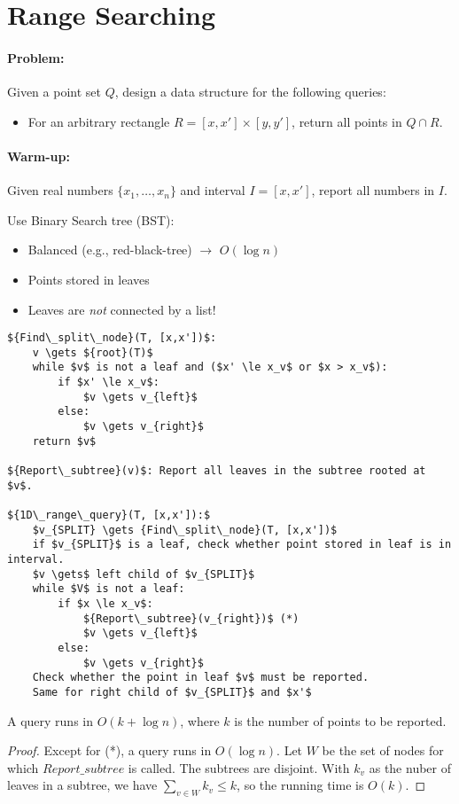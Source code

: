 \section{Range Searching}

\paragraph{Problem:} Given a point set $Q$, design a data structure for the following queries:

\begin{itemize}
	\item For an arbitrary rectangle $R = [x,x']\times[y,y']$, return all points in $Q \cap R$.
\end{itemize}

\paragraph{Warm-up:} Given real numbers $\{x_1, \ldots, x_n\}$ and interval $I = [x, x']$, report all numbers in $I$.

Use Binary Search tree (BST):
\begin{itemize}
	\item Balanced (e.g., red-black-tree) $\rightarrow$ $O(\log n)$
	\item Points stored in leaves
	\item Leaves are \emph{not} connected by a list!
\end{itemize}

\begin{lstlisting}[mathescape]
${Find\_split\_node}(T, [x,x'])$:
	v \gets ${root}(T)$
	while $v$ is not a leaf and ($x' \le x_v$ or $x > x_v$):
		if $x' \le x_v$:
			$v \gets v_{left}$
		else:
			$v \gets v_{right}$
	return $v$

${Report\_subtree}(v)$: Report all leaves in the subtree rooted at $v$.

${1D\_range\_query}(T, [x,x']):$
	$v_{SPLIT} \gets {Find\_split\_node}(T, [x,x'])$
	if $v_{SPLIT}$ is a leaf, check whether point stored in leaf is in interval.
	$v \gets$ left child of $v_{SPLIT}$
	while $V$ is not a leaf:
		if $x \le x_v$:
			${Report\_subtree}(v_{right})$ (*)
			$v \gets v_{left}$
		else:
			$v \gets v_{right}$
	Check whether the point in leaf $v$ must be reported.
	Same for right child of $v_{SPLIT}$ and $x'$
\end{lstlisting}

\begin{mylemma}
A query runs in $O(k + \log n)$, where $k$ is the number of points to be reported.	
\end{mylemma}
\begin{proof}
Except for (*), a query runs in $O(\log n)$. Let $W$ be the set of nodes for which ${Report\_subtree}$ is called. The subtrees are disjoint. With $k_v$ as the nuber of leaves in a subtree, we have $\sum_{v \in W} k_v \le k$, so the running time is $O(k)$.
\end{proof}

